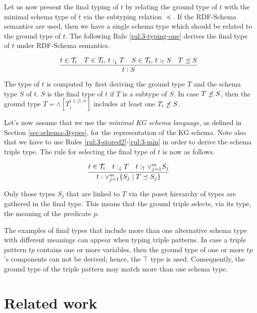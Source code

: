 \documentclass[runningheads]{llncs}
\newcommand{\darr}{\downarrow}
\newcommand{\uarr}{\uparrow}
\newcommand{\TT}{{\cal T}}
\begin{document}
Let us now present the final typing of $t$ by relating the ground type
of $t$ with the minimal schema type of $t$ via the subtyping relation
$\preceq$. If the RDF-Schema semantics are used, then we have a single
schema type which should be related to the ground type of $t$. The
following Rule \ref{rul:3-typing-one} derives the final type of $t$
under RDF-Schema semantics.

\begin{equation}
\label{rul:3-typing-one}
\dfrac{t\in\TT_i\quad T\in\TT_t,\, t:_{\darr}T\quad S\in\TT_t,\, t:_\uarr\/S\quad T\preceq\/S}
      {t:S}
\end{equation}

The type of $t$ is computed by first deriving the ground type $T$ and
the schema type $S$ of $t$. $S$ is the final type of $t$ if $T$ is a
subtype of $S$. In case $T\not\preceq\/S$, then the ground type
$T=\land[T_i^{i\in[1,n}]$ includes at least one $T_i\not\preceq\/S$.

Let's now assume that we use the \emph{minimal KG schema language}, as
defined in Section \ref{sec:schema-3types}, for the representation
of the KG schema. Note also that we have to use Rules
\ref{rul:3-stored2}-\ref{rul:3-min} in order to derive the schema
triple type. The rule for selecting the final type of $t$ is now as
follows.

\begin{equation}
\label{rul:3-typing-two}
\dfrac{t\in\TT_i\quad t:_{\darr}T\quad\/t:_\uarr\lor_{j=1}^{m}\/S_j}
      {t:\lor_{j=1}^m\{S_j \mid T\preceq\/S_j\}}
\end{equation}

Only those types $S_j$ that are linked to $T$ via the poset hierarchy
of types are gathered in the final type. This means that the ground
triple selects, via its type, the meaning of the predicate $p$.

The examples of final types that include more than one alternative
schema type with different meanings can appear when typing triple
patterns. In case a triple pattern $tp$ contains one or more
variables, then the ground type of one or more $tp$'s components can
not be derived; hence, the $\top$ type is used. Consequently, the
ground type of the triple pattern may match more than one schema type.






\section{Related work\label{sec:related}}
\end{document}
